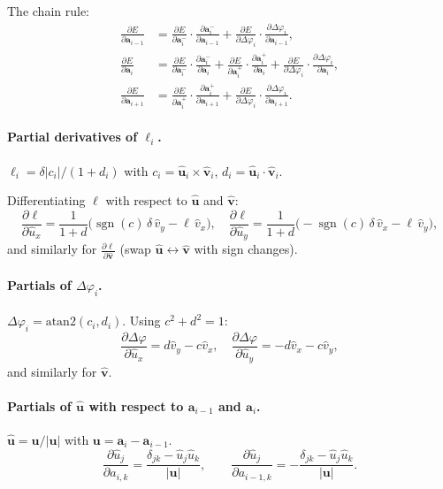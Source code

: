 \documentclass[12pt]{article}
\newcommand{\pderiv}[2]{\frac{\partial #1}{\partial #2}}
\newcommand{\uvec}{\hat{\mathbf{u}}}
\newcommand{\vvec}{\hat{\mathbf{v}}}
\DeclareMathOperator{\sgn}{sgn}
\begin{document}
The chain rule:
\begin{align*}
  \pderiv{E}{\mathbf{a}_{i-1}} &= \pderiv{E}{\mathbf{a}_i^-}\cdot\pderiv{\mathbf{a}_i^-}{\mathbf{a}_{i-1}}
    + \pderiv{E}{\Delta\varphi_i}\cdot\pderiv{\Delta\varphi_i}{\mathbf{a}_{i-1}}, \\
  \pderiv{E}{\mathbf{a}_i} &= \pderiv{E}{\mathbf{a}_i^-}\cdot\pderiv{\mathbf{a}_i^-}{\mathbf{a}_i}
    + \pderiv{E}{\mathbf{a}_i^+}\cdot\pderiv{\mathbf{a}_i^+}{\mathbf{a}_i}
    + \pderiv{E}{\Delta\varphi_i}\cdot\pderiv{\Delta\varphi_i}{\mathbf{a}_i}, \\
  \pderiv{E}{\mathbf{a}_{i+1}} &= \pderiv{E}{\mathbf{a}_i^+}\cdot\pderiv{\mathbf{a}_i^+}{\mathbf{a}_{i+1}}
    + \pderiv{E}{\Delta\varphi_i}\cdot\pderiv{\Delta\varphi_i}{\mathbf{a}_{i+1}}.
\end{align*}

\paragraph{Partial derivatives of $\ell_i$.}
$\ell_i = \delta|c_i|/(1+d_i)$ with $c_i = \uvec_i\times\vvec_i$, $d_i = \uvec_i\cdot\vvec_i$.

Differentiating $\ell$ with respect to $\hat{\mathbf{u}}$ and $\hat{\mathbf{v}}$:
\[
  \pderiv{\ell}{\hat u_x} = \frac{1}{1+d}\bigl(\sgn(c)\,\delta\,\hat v_y - \ell\,\hat v_x\bigr),
  \quad
  \pderiv{\ell}{\hat u_y} = \frac{1}{1+d}\bigl(-\sgn(c)\,\delta\,\hat v_x - \ell\,\hat v_y\bigr),
\]
and similarly for $\pderiv{\ell}{\hat{\mathbf{v}}}$ (swap $\uvec \leftrightarrow \vvec$ with sign changes).

\paragraph{Partials of $\Delta\varphi_i$.}
$\Delta\varphi_i = \mathrm{atan2}(c_i, d_i)$.  Using $c^2 + d^2 = 1$:
\[
  \pderiv{\Delta\varphi}{\hat u_x} = d\hat v_y - c\hat v_x,
  \quad
  \pderiv{\Delta\varphi}{\hat u_y} = -d\hat v_x - c\hat v_y,
\]
and similarly for $\hat{\mathbf{v}}$.

\paragraph{Partials of $\hat{\mathbf{u}}$ with respect to $\mathbf{a}_{i-1}$ and $\mathbf{a}_i$.}
$\hat{\mathbf{u}} = \mathbf{u}/|\mathbf{u}|$ with $\mathbf{u} = \mathbf{a}_i - \mathbf{a}_{i-1}$.
\[
  \pderiv{\hat u_j}{a_{i,k}} = \frac{\delta_{jk} - \hat u_j \hat u_k}{|\mathbf{u}|},
  \qquad
  \pderiv{\hat u_j}{a_{i-1,k}} = -\frac{\delta_{jk} - \hat u_j \hat u_k}{|\mathbf{u}|}.
\]
\end{document}
